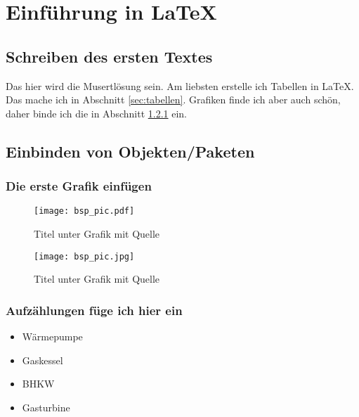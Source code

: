 
\chapter{Einführung in LaTeX}
	\label{chap:einfuehrung}
	
	
\section{Schreiben des ersten Textes}
	\label{sec:erster_text}
Das hier wird die Musertlösung sein. Am liebsten erstelle ich Tabellen in LaTeX. Das mache ich in Abschnitt \ref{sec:tabellen}. Grafiken finde ich aber auch schön, daher binde ich die in Abschnitt \ref{sec:grafik} ein.
	
\section{Einbinden von Objekten/Paketen}
	\label{sec:objekte}

	
\subsection{Die erste Grafik einfügen}
	\label{sec:grafik}
\begin{figure}[H]
	\centering
	\texttt{[image: bsp\_pic.pdf]}
	\caption[Titel fürs Inhaltsverzeichnis]{Titel unter Grafik mit Quelle 	\cite{openai2024chatgpt}}
	\label{fig:grafik_jpg}
\end{figure}

\begin{figure}[H]
	\centering
	\texttt{[image: bsp\_pic.jpg]}
	\caption[Titel fürs Inhaltsverzeichnis]{Titel unter Grafik mit Quelle \cite{openai2024chatgpt}}
	\label{fig:grafik_pdf}
\end{figure}
	
\subsection{Aufzählungen füge ich hier ein}
	\label{sec:aufzaehlung}

\begin{itemize}[noitemsep, label=+]
	\item Wärmepumpe
	\item Gaskessel 
	\item BHKW
	\item Gasturbine
\end{itemize}

